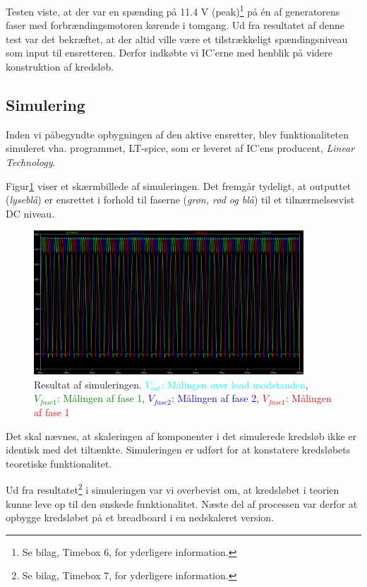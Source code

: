 Testen viste, at der var en spænding på 11.4 V (peak)\footnote{Se bilag, Timebox 6, for yderligere information.} på én af generatorens faser med forbrændingsmotoren kørende i tomgang. Ud fra resultatet af denne test var det bekræftet, at der altid ville være et tilstrækkeligt spændingsniveau som input til ensretteren. Derfor indkøbte vi IC’erne med henblik på videre konstruktion af kredsløb.

\subsection{Simulering}
\label{sec:simulering}

Inden vi påbegyndte opbygningen af den aktive ensretter, blev funktionaliteten simuleret vha. programmet, LT-spice, som er leveret af IC’ens producent, \textit{Linear Technology}.

Figur\ref{fig:prens6} viser et skærmbillede af simuleringen. Det fremgår tydeligt, at outputtet (\textit{lyseblå}) er ensrettet i forhold til faserne (\textit{grøn, rød og blå}) til et tilnærmelsesvist DC niveau. 

\begin{figure}[h]
  \centering
  \includegraphics[width=0.9\textwidth]{./figurer/prens6.png}
  \caption{Resultat af simuleringen. \textcolor{cyan}{$V_{out}$: Målingen over load modstanden}, \textcolor{green}{$V_{fase1}$: Målingen af fase 1}, \textcolor{blue}{$V_{fase2}$: Målingen af fase 2}, \textcolor{red}{$V_{fase1}$: Målingen af fase 1}}
  \label{fig:prens6}
\end{figure}

Det skal nævnes, at skaleringen af komponenter i det simulerede kredsløb ikke er identisk med det tiltænkte. Simuleringen er udført for at konstatere kredsløbets teoretiske funktionalitet.

Ud fra resultatet\footnote{Se bilag, Timebox 7, for yderligere information.} i simuleringen var vi overbevist om, at kredsløbet i teorien kunne leve op til den ønskede funktionalitet. Næste del af processen var derfor at opbygge kredsløbet på et breadboard i en nedskaleret version.

